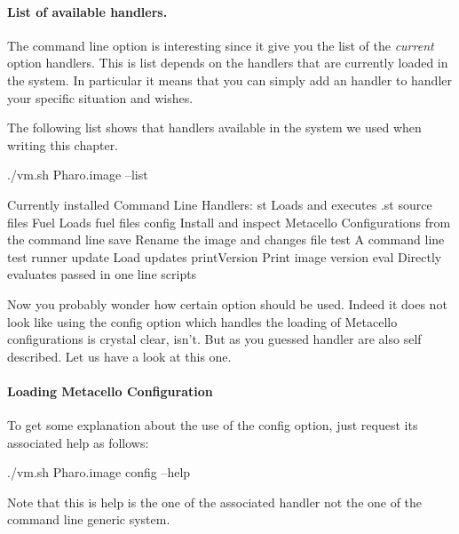 \documentclass[a4paper,10pt,twoside]{book}
\begin{document}
\paragraph{List of available handlers.} The command line option  is interesting since it give you the list of the \emph{current} option handlers. This is list depends on the handlers that are currently loaded in the system. In particular it means that you can simply add an handler to handler your specific situation and wishes.

The following list shows that handlers available in the system we used when writing this chapter.

\begin{code}{}
./vm.sh Pharo.image --list

Currently installed Command Line Handlers:
    st              Loads and executes .st source files
    Fuel            Loads fuel files
    config          Install and inspect Metacello Configurations from the command line
    save            Rename the image and changes file
    test            A command line test runner
    update          Load updates
    printVersion    Print image version
    eval            Directly evaluates passed in one line scripts
\end{code}

Now you probably wonder how certain option should be used. Indeed it does not look like using the config option which handles the loading of Metacello configurations is crystal clear, isn't. But as you guessed handler are also self described. Let us have a look at this one. 



\paragraph{Loading Metacello Configuration}
To get some explanation about the use of the config option, just request its associated help as follows: 
\begin{code}{}
./vm.sh Pharo.image config --help
\end{code}

Note that this is help is the one of the associated handler not the one of the command line generic system. 
\end{document}
